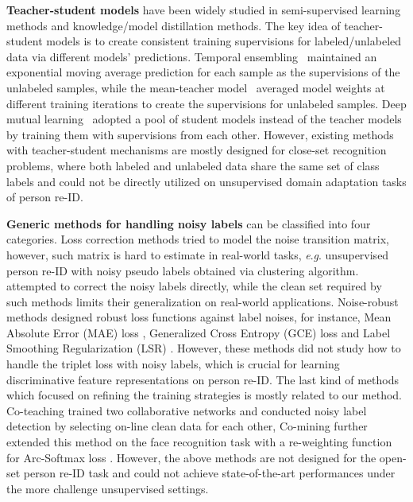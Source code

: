 \documentclass{article} \usepackage{iclr2020_conference,times}
\newcommand{\eg}{\textit{e}.\textit{g}. }
\begin{document}
\noindent\textbf{Teacher-student models} have been widely studied in semi-supervised learning methods and knowledge/model distillation methods.
The key idea of {teacher-student} models is to create consistent training supervisions for labeled/unlabeled data via different models' predictions.
Temporal ensembling~\citep{laine2016temporal} maintained an exponential moving average prediction for each sample as the supervisions of the unlabeled samples, while the mean-teacher model~\citep{tarvainen2017mean} averaged model weights at different training iterations to create the supervisions for unlabeled samples. 
Deep mutual learning~\citep{zhang2018deep} adopted a pool of student models instead of the teacher models by training them with supervisions from each other.
However, existing methods with {teacher-student} mechanisms are mostly designed for close-set recognition problems, where both labeled and unlabeled data share the same set of class labels and could not be directly utilized on unsupervised domain adaptation tasks of person re-ID.

\noindent\textbf{Generic methods for handling noisy labels}
can be classified into four categories.
Loss correction methods \citep{patrini2017making,vahdat2017toward,xiao2015learning} tried to model the noise transition matrix, however, such matrix is hard to estimate in real-world tasks, \eg unsupervised person re-ID with noisy pseudo labels obtained via clustering algorithm.
\citep{veit2017learning,lee2018cleannet,li2017learning,Han_2019_ICCV} attempted to correct the noisy labels directly, while the clean set required by such methods limits their generalization on real-world applications.
Noise-robust methods designed robust loss functions against label noises, for instance, Mean Absolute Error (MAE) loss \citep{ghosh2017robust}, Generalized Cross Entropy (GCE) loss \citep{zhang2018generalized} and Label Smoothing Regularization (LSR) \citep{szegedy2016rethinking}.
However, these methods did not study how to handle the triplet loss with noisy labels, which is crucial for learning discriminative feature representations on person re-ID.
The last kind of methods which focused on refining the training strategies is mostly related to our method. 
Co-teaching \citep{han2018co} trained two collaborative networks and conducted noisy label detection by selecting on-line clean data for each other, Co-mining \citep{wang2019co} further extended this method on the face recognition task with a re-weighting function for Arc-Softmax loss \citep{deng2019arcface}.
However, the above methods are not designed for the open-set person re-ID task and could not achieve state-of-the-art performances under the more challenge unsupervised settings.
\end{document}
